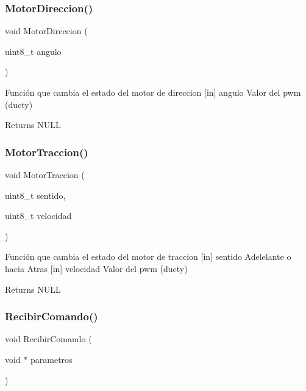 \subsubsection{Motor\+Direccion()}
{\footnotesize\ttfamily void Motor\+Direccion (\begin{DoxyParamCaption}\item[{uint8\+\_\+t}]{angulo }\end{DoxyParamCaption})}



Función que cambia el estado del motor de direccion [in] angulo Valor del pwm (ducty) 

\begin{DoxyReturn}{Returns}
N\+U\+LL 
\end{DoxyReturn}
\mbox{\label{group__ejemplos_gad80b8756be022716b80608fb8a0c5dd6}} 
\subsubsection{Motor\+Traccion()}
{\footnotesize\ttfamily void Motor\+Traccion (\begin{DoxyParamCaption}\item[{uint8\+\_\+t}]{sentido,  }\item[{uint8\+\_\+t}]{velocidad }\end{DoxyParamCaption})}



Función que cambia el estado del motor de traccion [in] sentido Adelelante o hacia Atras [in] velocidad Valor del pwm (ducty) 

\begin{DoxyReturn}{Returns}
N\+U\+LL 
\end{DoxyReturn}
\mbox{\label{group__ejemplos_gae9396fb4b6c954a8b52a74593c5d5b3b}} 
\subsubsection{Recibir\+Comando()}
{\footnotesize\ttfamily void Recibir\+Comando (\begin{DoxyParamCaption}\item[{void $\ast$}]{parametros }\end{DoxyParamCaption})}



